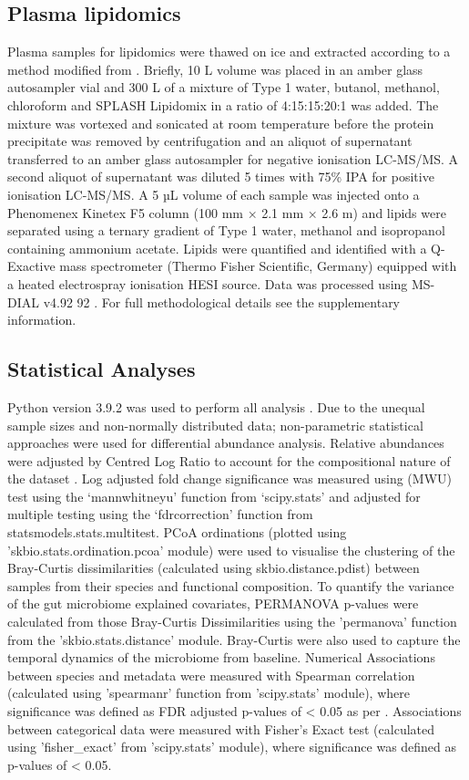 \documentclass{article}
\begin{document}
\subsection*{Plasma lipidomics}
Plasma samples for lipidomics were thawed on ice and extracted according to a method modified from \citet{liu2016plasma}.
Briefly, 10 \textmu{}L volume was placed in an amber glass autosampler vial and 300 \textmu{}L of a mixture of Type 1 water, butanol, methanol, chloroform and SPLASH Lipidomix in a ratio of 4:15:15:20:1 was added.
The mixture was vortexed and sonicated at room temperature before the protein precipitate was removed by centrifugation and an aliquot of supernatant transferred to an amber glass autosampler for negative ionisation LC-MS/MS.
A second aliquot of supernatant was diluted 5 times with 75\% IPA for positive ionisation LC-MS/MS.
A 5 µL volume of each sample was injected onto a Phenomenex Kinetex F5 column (100 mm × 2.1 mm × 2.6 \textmu{}m) and lipids were separated using a ternary gradient of Type 1 water, methanol and isopropanol containing ammonium acetate.
Lipids were quantified and identified with a Q-Exactive mass spectrometer (Thermo Fisher Scientific, Germany) equipped with a heated electrospray ionisation HESI source.
Data was processed using MS-DIAL v4.92 92 \cite{tsugawa2015ms}.
For full methodological details see the supplementary information.

\subsection*{Statistical Analyses}
Python version 3.9.2 was used to perform all analysis \cite{van1995python}.
Due to the unequal sample sizes and non-normally distributed data; non-parametric statistical approaches were used for differential abundance analysis.
Relative abundances were adjusted by Centred Log Ratio to account for the compositional nature of the dataset \cite{gloor2016s}.
Log adjusted fold change significance was measured using (MWU) test using the ‘mannwhitneyu’ function from ‘scipy.stats’ and adjusted for multiple testing using the ‘fdrcorrection’ function from statsmodels.stats.multitest.
PCoA ordinations (plotted using 'skbio.stats.ordination.pcoa' module) were used to visualise the clustering of the Bray-Curtis dissimilarities (calculated using skbio.distance.pdist) between samples from their species and functional composition.
To quantify the variance of the gut microbiome explained covariates, PERMANOVA p-values were calculated from those Bray-Curtis Dissimilarities using the ’permanova’ function from the 'skbio.stats.distance' module.
Bray-Curtis were also used to capture the temporal dynamics of the microbiome from baseline.
Numerical Associations between species and metadata were measured with Spearman correlation (calculated using 'spearmanr' function from 'scipy.stats' module), where significance was defined as FDR adjusted p-values of \textless{} 0.05 as per \citet{2020SciPyNMeth}.
Associations between categorical data were measured with Fisher's Exact test (calculated using 'fisher\_exact' from 'scipy.stats' module), where significance was defined as p-values of \textless{} 0.05.
\end{document}
